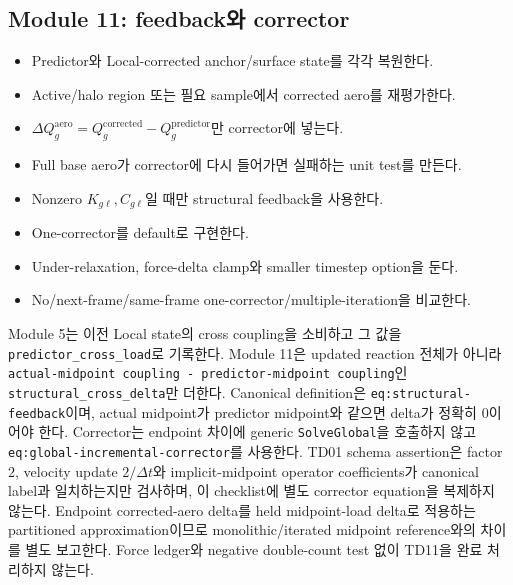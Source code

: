\documentclass[10pt,a4paper]{article}
\newcommand{\todo}{\textcolor{TodoGray}{\(\square\)}}
\newcommand{\code}[1]{\texttt{#1}}
\begin{document}
\subsection*{Module 11: feedback와 corrector}

\begin{itemize}
  \item[\todo] Predictor와 Local-corrected anchor/surface state를 각각 복원한다.
  \item[\todo] Active/halo region 또는 필요 sample에서 corrected aero를 재평가한다.
  \item[\todo] \(\Delta Q_g^{\mathrm{aero}}=Q_g^{\mathrm{corrected}}-Q_g^{\mathrm{predictor}}\)만 corrector에 넣는다.
  \item[\todo] Full base aero가 corrector에 다시 들어가면 실패하는 unit test를 만든다.
  \item[\todo] Nonzero \(K_{g\ell},C_{g\ell}\)일 때만 structural feedback을 사용한다.
  \item[\todo] One-corrector를 default로 구현한다.
  \item[\todo] Under-relaxation, force-delta clamp와 smaller timestep option을 둔다.
  \item[\todo] No/next-frame/same-frame one-corrector/multiple-iteration을 비교한다.
\end{itemize}

\begin{tcolorbox}[colback=LightRed,colframe=BlockRed,title=Structural feedback 소비 계약,fonttitle=\bfseries]
Module 5는 이전 Local state의 cross coupling을 소비하고 그 값을 \code{predictor\_cross\_load}로 기록한다.
Module 11은 updated reaction 전체가 아니라
\code{actual-midpoint coupling - predictor-midpoint coupling}인
\code{structural\_cross\_delta}만 더한다.
Canonical definition은 \code{eq:structural-feedback}이며,
actual midpoint가 predictor midpoint와 같으면 delta가 정확히 0이어야 한다.
Corrector는 endpoint 차이에 generic \code{SolveGlobal}을 호출하지 않고
\code{eq:global-incremental-corrector}를 사용한다.
TD01 schema assertion은 factor $2$, velocity update $2/\Delta t$와
implicit-midpoint operator coefficients가 canonical label과 일치하는지만 검사하며,
이 checklist에 별도 corrector equation을 복제하지 않는다.
Endpoint corrected-aero delta를 held midpoint-load delta로 적용하는 partitioned approximation이므로
monolithic/iterated midpoint reference와의 차이를 별도 보고한다.
Force ledger와 negative double-count test 없이 TD11을 완료 처리하지 않는다.
\end{tcolorbox}
\end{document}
